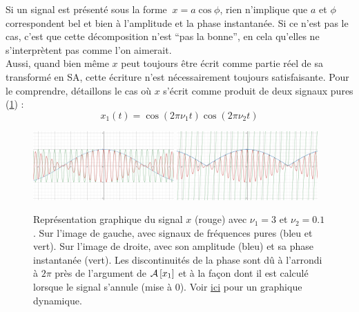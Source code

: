 Si un signal est présenté sous la forme  $\ x=a\cos\phi$, rien n'implique que $a$ et $\phi$ correspondent bel et bien à l'amplitude et la phase instantanée. Si ce n'est pas le cas, c'est que cette décomposition n'est ``pas la bonne'', en cela qu'elles ne s’interprètent pas comme l'on aimerait.
\\
Aussi, quand bien même $x$ peut toujours être écrit comme partie réel de sa transformé en SA, cette écriture n'est nécessairement toujours satisfaisante. Pour le comprendre, détaillons le cas où $x$ s'écrit comme produit de deux signaux pures (\cref{fig:exemple_tSA_1/2}) :
\[x_1(t) = \cos (2\pi\nu_1t)\cos (2\pi\nu_2t)\]

\begin{figure}[h]\centering
	\includegraphics[width=0.48\textwidth]{fig/ex SA - 11.png}
	\hfill
	\includegraphics[width=0.48\textwidth]{fig/ex SA - 12.png}
	\caption{Représentation graphique du signal $x$ (rouge) avec $\nu_1=3$ et $\nu_2=0.1$. Sur l'image de gauche, avec signaux de fréquences pures (bleu et vert). Sur l'image de droite, avec son amplitude (bleu) et sa phase instantanée (vert). Les discontinuités de la phase sont dû à l'arrondi à $2\pi$  près de l'argument de $\mathcal{A}\left[x_1\right]$ et à la façon dont il est calculé lorsque le signal s'annule (mise à 0). Voir \href{https://www.desmos.com/calculator/gcedcdfkhr}{ici} pour un graphique dynamique.}
	\label{fig:exemple_tSA_1/2}
\end{figure}

